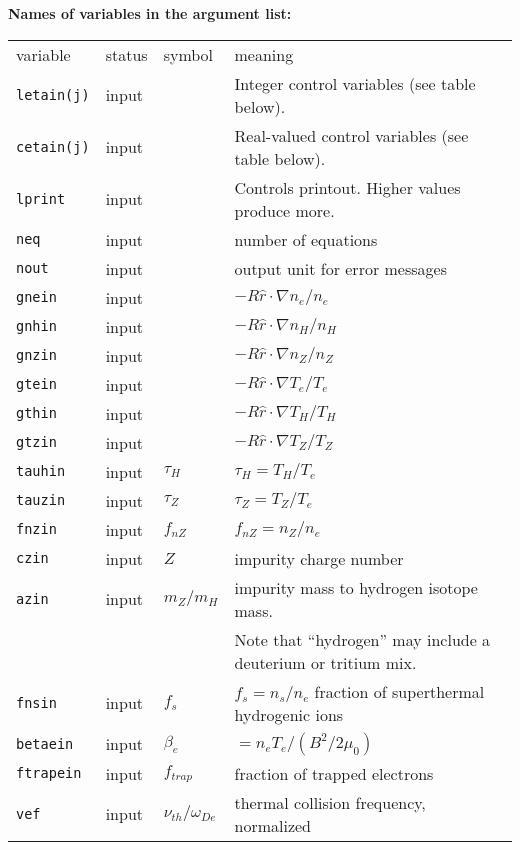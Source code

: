 \begin{center}
{\bf Names of variables in the argument list:}
\begin{tabular}{lllp{3.0in}}
variable & status & symbol & meaning \\
{\tt letain(j)} & input & & Integer control variables
                            (see table below).\\
{\tt cetain(j)} & input & & Real-valued control variables
                            (see table below).\\
{\tt lprint}    & input & & Controls printout. 
 Higher values produce more. \\
{\tt neq} & input & & number of equations \\
{\tt nout} & input & & output unit for error messages \\
{\tt gnein} & input & $  $ & $ - R\hat{r} \cdot \nabla n_e / n_e $ \\
{\tt gnhin} & input & $  $ & $ - R\hat{r} \cdot \nabla n_H / n_H $ \\
{\tt gnzin} & input & $  $ & $ - R\hat{r} \cdot \nabla n_Z / n_Z $ \\
{\tt gtein} & input & $  $ & $ - R\hat{r} \cdot \nabla T_e / T_e $ \\
{\tt gthin} & input & $  $ & $ - R\hat{r} \cdot \nabla T_H / T_H $ \\
{\tt gtzin} & input & $  $ & $ - R\hat{r} \cdot \nabla T_Z / T_Z $ \\
{\tt tauhin} & input & $\tau_H$ & $ \tau_H = T_H / T_e $ \\
{\tt tauzin} & input & $\tau_Z$ & $ \tau_Z = T_Z / T_e $ \\
{\tt fnzin} & input & $ f_{nZ} $ & $f_{nZ} = n_Z / n_e $ \\
{\tt czin}  & input & $ Z $ & impurity charge number \\
{\tt azin}  & input & $ m_Z / m_H $
     & impurity mass to hydrogen isotope mass. \\
 & & & Note that ``hydrogen'' may include a deuterium or tritium mix. \\
{\tt fnsin}  & input & $ f_s $
  & $ f_s = n_s / n_e $ fraction of superthermal hydrogenic ions \\
{\tt betaein} & input & $\beta_e$ &
     $ = n_e T_e / ( B^2 / 2 \mu_0 ) $ \\
{\tt ftrapein}  & input & $f_{trap} $ &
    fraction of trapped electrons \\
{\tt vef}       & input & $ \nu_{th} / \omega_{De} $ &
     thermal collision frequency, normalized \\

\end{tabular}
\end{center}
